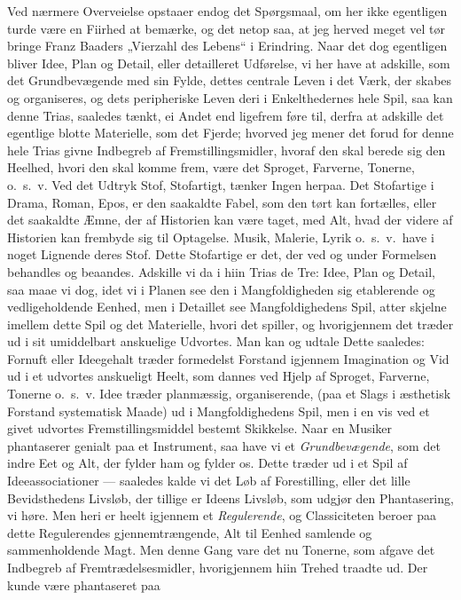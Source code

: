 \documentclass[12pt,a4paper]{book}
\newcommand{\apage}[1]{\marginnote{\footnotesize\textit{[#1]}}}
\begin{document}
Ved nærmere Overveielse opstaaer endog det Spørgsmaal, om her ikke
egentligen turde være en Fiirhed at bemærke, og det netop saa, at jeg
herved meget vel tør bringe Franz Baaders „Vierzahl des Lebens“ i
Erindring. Naar det dog egentligen bliver Idee, Plan og Detail, eller
detailleret Udførelse, vi her have at adskille, som det Grundbevægende med
sin Fylde, dettes centrale Leven i det Værk, der skabes og organiseres, og
dets peripheriske Leven deri i Enkelthedernes hele Spil, saa kan denne
Trias, saaledes tænkt, ei Andet end ligefrem føre til, derfra at adskille
det egentlige blotte Materielle, som det Fjerde; hvorved jeg mener det
forud for denne hele Trias givne Indbegreb af Fremstillingsmidler, hvoraf
den skal berede sig den Heelhed, hvori den skal komme frem, være det
Sproget, Farverne, Tonerne, o.\ s.\ v. Ved det Udtryk Stof, Stofartigt,
tænker Ingen herpaa. Det Stofartige i Drama, Roman, Epos, er den saakaldte
Fabel, som den tørt kan fortælles, eller det saakaldte Æmne, der af
Historien kan være taget, med Alt, hvad der videre af Historien kan
frembyde sig til Optagelse. Musik, Malerie, Lyrik o.\ s.\ v.\ have i noget
Lignende deres Stof. Dette Stofartige er det, der ved og under Formelsen
behandles og beaandes. Adskille vi da i hiin Trias de Tre: Idee, Plan og
Detail, saa maae vi dog, idet vi i Planen see den i Mangfoldigheden sig
etablerende og vedligeholdende Eenhed, men i Detaillet see
Mangfoldighedens Spil, atter skjelne imellem dette Spil og det Materielle,
hvori det spiller, og hvorigjennem det træder ud i sit umiddelbart
anskuelige Udvortes. Man kan og udtale Dette saaledes: Fornuft eller
Ideegehalt træder formedelst Forstand igjennem Imagination og Vid ud i et
udvortes anskueligt Heelt, som dannes ved Hjelp af Sproget, Farverne,
Tonerne o.\ s.\ v. Idee træder planmæssig, organiserende, (paa et Slags i
æsthetisk Forstand systematisk Maade) ud i \apage{6} Mangfoldighedens Spil, men i en
vis ved et givet udvortes Fremstillingsmiddel bestemt Skikkelse. Naar en
Musiker phantaserer genialt paa et Instrument, saa have vi et
\emph{Grundbevægende}, som det indre Eet og Alt, der fylder ham og fylder os.
Dette træder ud i et Spil af Ideeassociationer --- saaledes kalde vi det
Løb af Forestilling, eller det lille Bevidsthedens Livsløb, der tillige er
Ideens Livsløb, som udgjør den Phantasering, vi høre. Men heri er heelt
igjennem et \emph{Regulerende}, og Classiciteten beroer paa dette Regulerendes
gjennemtrængende, Alt til Eenhed samlende og sammenholdende Magt. Men denne
Gang vare det nu Tonerne, som afgave det Indbegreb af Fremtrædelsesmidler,
hvorigjennem hiin Trehed traadte ud. Der kunde være phantaseret paa
\end{document}
